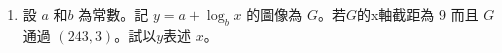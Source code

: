 \documentclass[11pt]{article}
\begin{document}
\begin{enumerate}
            \hrulefill
            
            \hrulefill
            
            \hrulefill
            
            \hrulefill
            
            \hrulefill
            
            \hrulefill
            
            \hrulefill

        \pagebreak
        \item 設 $a$ 和$b$ 為常數。記 $y=a+\log_b{x}$ 的圖像為 $G$。若$G$的x軸截距為 9 而且 $G$ 通過 $(243,3)$。試以$y$表述 $x$。
        
        \hrulefill
            
            \hrulefill
            
            \hrulefill
            
            \hrulefill
            
            \hrulefill
            
            \hrulefill
            
            \hrulefill
            
            \hrulefill
            
            \hrulefill
            
            \hrulefill

            \hrulefill
            
            \hrulefill
            
            \hrulefill
            
            \hrulefill
            
            \hrulefill
            
            \hrulefill
            
            \hrulefill
            
            \hrulefill
            
            \hrulefill
            
            \hrulefill
            
            \hrulefill
            
            \hrulefill
            
            \hrulefill
            
            \hrulefill
            
            \hrulefill
            

\end{enumerate}
\end{document}
